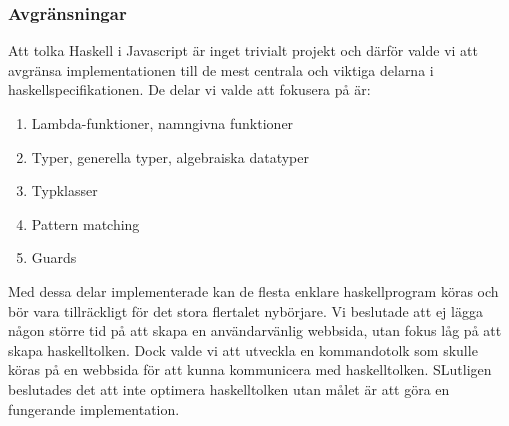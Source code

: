 



\subsubsection{Avgränsningar} 
Att tolka Haskell i Javascript är inget trivialt projekt och därför valde vi att avgränsa implementationen till de mest centrala och viktiga delarna i haskellspecifikationen. De delar vi valde att fokusera på är:
        \begin{enumerate}
            \item{Lambda-funktioner, namngivna funktioner}
            \item{Typer, generella typer, algebraiska datatyper}
            \item{Typklasser}
            \item{Pattern matching}
            \item{Guards}
        \end{enumerate}
Med dessa delar implementerade kan de flesta enklare haskellprogram köras och bör vara tillräckligt för det stora flertalet nybörjare. Vi beslutade att ej lägga någon större tid på att skapa en användarvänlig webbsida, utan fokus låg på att skapa haskelltolken. Dock valde vi att utveckla en kommandotolk som skulle köras på en webbsida för att kunna kommunicera med haskelltolken. 
SLutligen beslutades det att inte optimera haskelltolken utan målet är att göra en fungerande implementation. 

